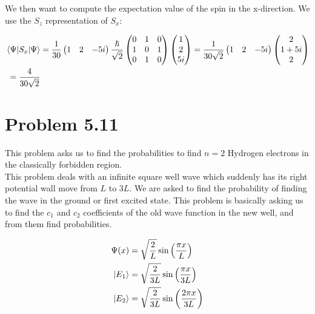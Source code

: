 \documentclass[10pt]{article} %
\begin{document}
We then want to compute the expectation value of the spin in the x-direction. We use the
$S_z$ representation of $S_x$:

\begin{align*}
  \expval{S_x}{\Psi} &= \frac{1}{30}\begin{pmatrix}1&2&-5i\end{pmatrix}\frac{\hslash}{\sqrt{2}}
    \begin{pmatrix}0&1&0\\1&0&1\\0&1&0\\\end{pmatrix}\begin{pmatrix}1\\2\\5i\end{pmatrix}
        = \frac{1}{30\sqrt{2}}\begin{pmatrix}1&2&-5i\end{pmatrix}
          \begin{pmatrix}2\\1+5i\\2\end{pmatrix}\\
            = \frac{4}{30\sqrt{2}}\\
\end{align*}

\section{Problem 5.11}
This problem asks us to find the probabilities to find $n=2$ Hydrogen electrons in the classically
forbidden region.\\

This problem deals with an infinite square well wave which suddenly has its right potential wall
move from $L$ to $3L$. We are asked to find the probability of finding the wave in the ground or
first excited state. This problem is basically asking us to find the $c_1$ and $c_2$ coefficients
of the old wave function in the new well, and from them find probabilities.

\begin{align*}
  \Psi(x) &= \sqrt{\frac{2}{L}}\sin\left(\frac{\pi x}{L}\right)\\
  \ket{E_1} &= \sqrt{\frac{2}{3L}}\sin\left(\frac{\pi x}{3L}\right)\\
  \ket{E_2} &= \sqrt{\frac{2}{3L}}\sin\left(\frac{2\pi x}{3L}\right)\\
\end{align*}
\end{document}
